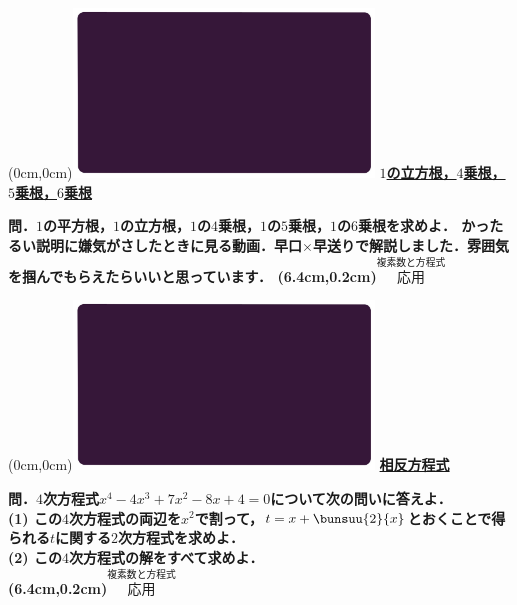 \documentclass[10pt,
fleqn,
dvipdfmx,
uplatex
]{jsarticle}
\begin{document}
\newpage



\at(0cm,0cm){\includegraphics[width=8cm,bb=0 0 1920 1080]{./youtube/thumbnails/templates/smart_background/複素数と方程式.jpeg}}
{\color{orange}\bf\boldmath\large\underline{$1$の立方根，$4$乗根，$5$乗根，$6$乗根}}\vspace{0.3zw}

\large 
\bf\boldmath 問．$1$の平方根，$1$の立方根，$1$の$4$乗根，$1$の$5$乗根，$1$の$6$乗根を求めよ．
かったるい説明に嫌気がさしたときに見る動画．早口$×$早送りで解説しました．雰囲気を掴んでもらえたらいいと思っています．
\at(6.4cm,0.2cm){\small\color{bradorange}$\overset{\text{複素数と方程式}}{\text{応用}}$}


\newpage



\at(0cm,0cm){\includegraphics[width=8cm,bb=0 0 1920 1080]{./youtube/thumbnails/templates/smart_background/複素数と方程式.jpeg}}
{\color{orange}\bf\boldmath\huge\underline{相反方程式}}\vspace{0.3zw}

\normalsize 
\bf\boldmath 問．$4$次方程式$x^4-4x^3+7x^2-8x+4=0$について次の問いに答えよ．\\
(1)  この$4$次方程式の両辺を$x^2$で割って，$t=x+\bunsuu{2}{x}$とおくことで得られる$t$に関する$2$次方程式を求めよ．\\
(2)  この$4$次方程式の解をすべて求めよ．\\

\at(6.4cm,0.2cm){\small\color{bradorange}$\overset{\text{複素数と方程式}}{\text{応用}}$}


\newpage
\end{document}
